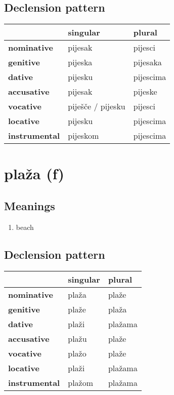 \subsection*{Declension pattern}
\begin{tabularx}{\linewidth}{Xll}
\toprule
{} &           singular &     plural \\
\midrule
\textbf{nominative  } &            pijesak &    pijesci \\
\textbf{genitive    } &            pijeska &   pijesaka \\
\textbf{dative      } &            pijesku &  pijescima \\
\textbf{accusative  } &            pijesak &    pijeske \\
\textbf{vocative    } &  piješče / pijesku &    pijesci \\
\textbf{locative    } &            pijesku &  pijescima \\
\textbf{instrumental} &           pijeskom &  pijescima \\
\bottomrule
\end{tabularx}

\filbreak
\section{plaža (f)}
\subsection*{Meanings}
\begin{enumerate}
\item beach
\end{enumerate}
\subsection*{Declension pattern}
\begin{tabularx}{\linewidth}{Xll}
\toprule
{} & singular &   plural \\
\midrule
\textbf{nominative  } &    plaža &    plaže \\
\textbf{genitive    } &    plaže &    plaža \\
\textbf{dative      } &    plaži &  plažama \\
\textbf{accusative  } &    plažu &    plaže \\
\textbf{vocative    } &    plažo &    plaže \\
\textbf{locative    } &    plaži &  plažama \\
\textbf{instrumental} &   plažom &  plažama \\
\bottomrule
\end{tabularx}

